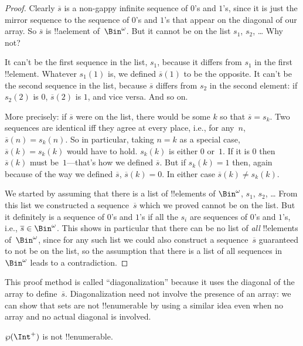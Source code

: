 \documentclass[../../../include/open-logic-section]{subfiles}
\begin{document}
\begin{proof}
Clearly $\overline{s}$ is a non-gappy infinite sequence of $0$'s and
$1$'s, since it is just the mirror sequence to the sequence of $0$'s
and $1$'s that appear on the diagonal of our array.  So $\overline{s}$
is !!a{element} of~$\Bin^\omega$.  But it cannot be on the list $s_1$,
$s_2$, \dots{} Why not?

It can't be the first sequence in the list, $s_1$, because it differs from
$s_1$ in the first !!{element}.  Whatever $s_1(1)$ is, we defined
$\overline{s}(1)$ to be the opposite.  It can't be the second
sequence in the list, because $\overline{s}$ differs from $s_2$ in the second
element: if $s_2(2)$ is $0$, $\overline{s}(2)$ is $1$, and vice
versa. And so on.

More precisely: if $\overline{s}$ were on the list, there would be
some $k$ so that $\overline{s} = s_{k}$.  Two sequences are identical
iff they agree at every place, i.e., for any~$n$, $\overline{s}(n) =
s_{k}(n)$.  So in particular, taking $n = k$ as a special case,
$\overline{s}(k) = s_{k}(k)$ would have to hold. $s_k(k)$ is either
$0$ or~$1$. If it is $0$ then $\overline{s}(k)$ must be~$1$---that's
how we defined $\overline{s}$. But if $s_k(k) = 1$ then, again because
of the way we defined $\overline{s}$, $\overline{s}(k) = 0$. In either
case $\overline{s}(k) \neq s_{k}(k)$.

We started by assuming that there is a list of !!{element}s of
$\Bin^\omega$, $s_1$, $s_2$, \dots{} From this list we constructed a
sequence~$\overline{s}$ which we proved cannot be on the list.  But it
definitely is a sequence of $0$'s and $1$'s if all the $s_i$ are
sequences of $0$'s and $1$'s, i.e., $\overline{s} \in
\Bin^\omega$. This shows in particular that there can be no list of
\emph{all} !!{element}s of~$\Bin^\omega$, since for any such list we
could also construct a sequence~$\overline{s}$ guaranteed to not be on
the list, so the assumption that there is a list of all sequences
in~$\Bin^\omega$ leads to a contradiction.
\end{proof}

\begin{explain}
This proof method is called ``diagonalization'' because it uses the
diagonal of the array to define~$\overline{s}$. Diagonalization need
not involve the presence of an array: we can show that sets are not
!!{enumerable} by using a similar idea even when no array and no
actual diagonal is involved.
\end{explain}

\begin{thm}
$\Pow{\Int^+}$ is not !!{enumerable}.
\end{thm}
\end{document}

